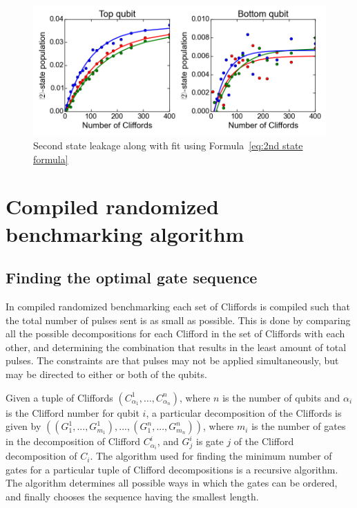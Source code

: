         \begin{figure}[h]
          \centering
          \includegraphics[width=\textwidth]{../Figures/Randomized benchmarking/2nd-state leakage 2Q.png}
          \caption{Second state leakage along with fit using Formula~\ref{eq:2nd state formula}}
          \label{fig:second state leakage 2Q}
        \end{figure}

\chapter{Compiled randomized benchmarking algorithm}
  \label{sec:compiled randomized benchmarking algorithm}
  \section{Finding the optimal gate sequence}
    In compiled randomized benchmarking each set of Cliffords is compiled such that the total number of pulses sent is as small as possible. This is done by comparing all the possible decompositions for each Clifford in the set of Cliffords with each other, and determining the combination that results in the least amount of total pulses. The constraints are that pulses may not be applied simultaneously, but may be directed to either or both of the qubits.

    Given a tuple of Cliffords $\left(C_{\alpha_1}^1, \dots, C_{\alpha_n}^n\right)$, where $n$ is the number of qubits and $\alpha_i$ is the Clifford number for qubit $i$, a particular decomposition of the Cliffords is given by $\left(\left( G_1^1, ..., G_{m_1}^1 \right) , ..., \left(G_1^n, ..., G_{m_n}^n\right)\right)$, where $m_i$ is the number of gates in the decomposition of Clifford $C_{\alpha_i}^i$, and $G_j^i$ is gate $j$ of the Clifford decomposition of $C_i$. The algorithm used for finding the minimum number of gates for a particular tuple of Clifford decompositions is a recursive algorithm. The algorithm determines all possible ways in which the gates can be ordered, and finally chooses the sequence having the smallest length.

